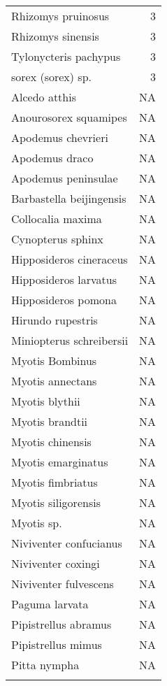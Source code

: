\documentclass[11pt,article,oneside]{article}
\begin{document}
\begin{longtable}[c]{@{}lr@{}}
Rhizomys pruinosus & 3
\\\addlinespace
Rhizomys sinensis & 3
\\\addlinespace
Tylonycteris pachypus & 3
\\\addlinespace
sorex (sorex) sp. & 3
\\\addlinespace
Alcedo atthis & NA
\\\addlinespace
Anourosorex squamipes & NA
\\\addlinespace
Apodemus chevrieri & NA
\\\addlinespace
Apodemus draco & NA
\\\addlinespace
Apodemus peninsulae & NA
\\\addlinespace
Barbastella beijingensis & NA
\\\addlinespace
Collocalia maxima & NA
\\\addlinespace
Cynopterus sphinx & NA
\\\addlinespace
Hipposideros cineraceus & NA
\\\addlinespace
Hipposideros larvatus & NA
\\\addlinespace
Hipposideros pomona & NA
\\\addlinespace
Hirundo rupestris & NA
\\\addlinespace
Miniopterus schreibersii & NA
\\\addlinespace
Myotis Bombinus & NA
\\\addlinespace
Myotis annectans & NA
\\\addlinespace
Myotis blythii & NA
\\\addlinespace
Myotis brandtii & NA
\\\addlinespace
Myotis chinensis & NA
\\\addlinespace
Myotis emarginatus & NA
\\\addlinespace
Myotis fimbriatus & NA
\\\addlinespace
Myotis siligorensis & NA
\\\addlinespace
Myotis sp. & NA
\\\addlinespace
Niviventer confucianus & NA
\\\addlinespace
Niviventer coxingi & NA
\\\addlinespace
Niviventer fulvescens & NA
\\\addlinespace
Paguma larvata & NA
\\\addlinespace
Pipistrellus abramus & NA
\\\addlinespace
Pipistrellus mimus & NA
\\\addlinespace
Pitta nympha & NA
\\\addlinespace

\end{longtable}
\end{document}
